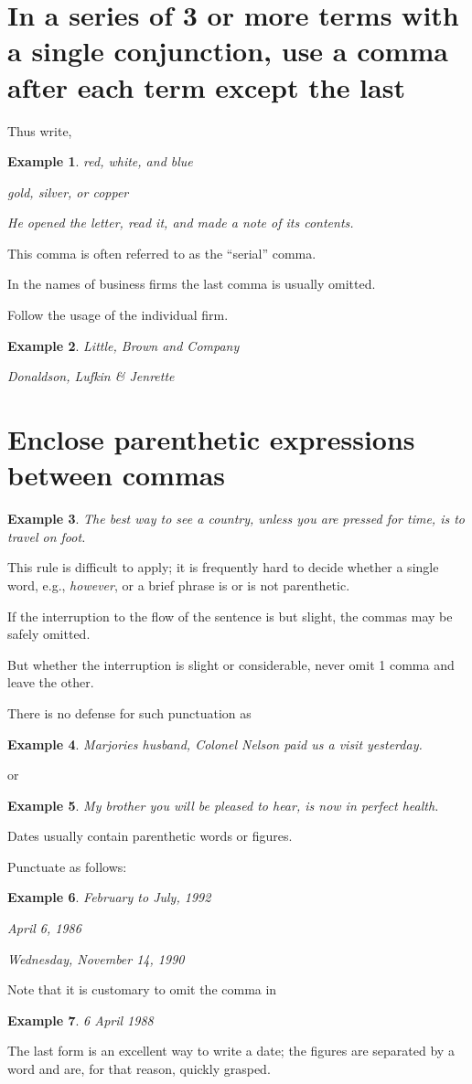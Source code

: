 \documentclass{book}
\numberwithin{equation}{section}
\newtheorem{example}{Example}[chapter]
\begin{document}
\section{In a series of 3 or more terms with a single conjunction, use a comma after each term except the last}
Thus write,
\begin{example}
    red, white, and blue
    
    gold, silver, or copper
    
    He opened the letter, read it, and made a note of its contents.
\end{example}
This comma is often referred to as the ``serial'' comma.

In the names of business firms the last comma is usually omitted.

Follow the usage of the individual firm.
\begin{example}
    Little, Brown and Company
    
    Donaldson, Lufkin \& Jenrette
\end{example}

\section{Enclose parenthetic expressions between commas}
\begin{example}
    The best way to see a country, unless you are pressed for time, is to travel on foot.
\end{example}
This rule is difficult to apply; it is frequently hard to decide whether a single word, e.g., \textit{however}, or a brief phrase is or is not parenthetic.

If the interruption to the flow of the sentence is but slight, the commas may be safely omitted.

But whether the interruption is slight or considerable, never omit 1 comma and leave the other.

There is no defense for such punctuation as
\begin{example}
    Marjories husband, Colonel Nelson paid us a visit yesterday.
\end{example}
or
\begin{example}
    My brother you will be pleased to hear, is now in perfect health.
\end{example}
Dates usually contain parenthetic words or figures.

Punctuate as follows:
\begin{example}
    February to July, 1992
    
    April 6, 1986
    
    Wednesday, November 14, 1990
\end{example}
Note that it is customary to omit the comma in
\begin{example}
    6 April 1988
\end{example}
The last form is an excellent way to write a date; the figures are separated by a word and are, for that reason, quickly grasped.
\end{document}
